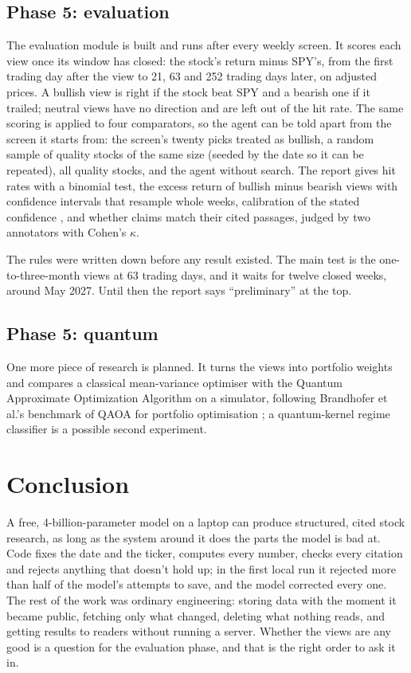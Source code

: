 \documentclass[11pt,a4paper]{article}
\begin{document}
\subsection{Phase 5: evaluation}\label{sec:eval}

The evaluation module is built and runs after every weekly screen. It scores each view once its window has
closed: the stock's return minus SPY's, from the first trading day after the view to 21, 63 and 252 trading
days later, on adjusted prices. A bullish view is right if the stock beat SPY and a bearish one if it
trailed; neutral views have no direction and are left out of the hit rate. The same scoring is applied to
four comparators, so the agent can be told apart from the screen it starts from: the screen's twenty picks
treated as bullish, a random sample of quality stocks of the same size (seeded by the date so it can be
repeated), all quality stocks, and the agent without search. The report gives hit rates with a binomial
test, the excess return of bullish minus bearish views with confidence intervals that resample whole weeks,
calibration of the stated confidence \cite{guo2017calibration}, and whether claims match their cited
passages, judged by two annotators with Cohen's $\kappa$.

The rules were written down before any result existed. The main test is the one-to-three-month views at 63
trading days, and it waits for twelve closed weeks, around May 2027. Until then the report says
``preliminary'' at the top.

\subsection{Phase 5: quantum}

One more piece of research is planned. It turns the views into portfolio weights and compares a
classical mean-variance optimiser with the Quantum Approximate Optimization Algorithm
\cite{farhi2014quantum} on a simulator, following Brandhofer et al.'s benchmark of QAOA for portfolio
optimisation \cite{brandhofer2022benchmarking}; a quantum-kernel regime classifier
\cite{havlicek2018supervised} is a possible second experiment.

\section{Conclusion}

A free, 4-billion-parameter model on a laptop can produce structured, cited stock research, as long as the
system around it does the parts the model is bad at. Code fixes the date and the ticker, computes every
number, checks every citation and rejects anything that doesn't hold up; in the first local run it
rejected more than half of the model's attempts to save, and the model corrected every one. The rest of
the work was ordinary engineering: storing data with the moment it became public, fetching only what
changed, deleting what nothing reads, and getting results to readers without running a server. Whether
the views are any good is a question for the evaluation phase, and that is the right order to ask it in.
\end{document}
